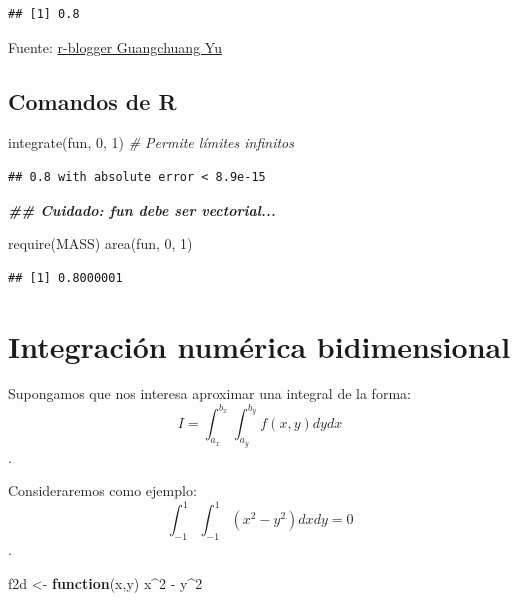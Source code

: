 \documentclass[
]{book}
\newenvironment{Shaded}{\begin{snugshade}}{\end{snugshade}}
\newcommand{\CommentTok}[1]{\textcolor[rgb]{0.56,0.35,0.01}{\textit{#1}}}
\newcommand{\ControlFlowTok}[1]{\textcolor[rgb]{0.13,0.29,0.53}{\textbf{#1}}}
\newcommand{\DecValTok}[1]{\textcolor[rgb]{0.00,0.00,0.81}{#1}}
\newcommand{\DocumentationTok}[1]{\textcolor[rgb]{0.56,0.35,0.01}{\textbf{\textit{#1}}}}
\newcommand{\FunctionTok}[1]{\textcolor[rgb]{0.00,0.00,0.00}{#1}}
\newcommand{\NormalTok}[1]{#1}
\newcommand{\OtherTok}[1]{\textcolor[rgb]{0.56,0.35,0.01}{#1}}
\newcommand{\SpecialCharTok}[1]{\textcolor[rgb]{0.00,0.00,0.00}{#1}}
\theoremstyle{break}
\theoremstyle{nonumberplain}
\begin{document}
\begin{verbatim}
## [1] 0.8
\end{verbatim}

Fuente: \href{https://www.r-bloggers.com/one-dimensional-integrals}{r-blogger Guangchuang Yu}

\hypertarget{comandos-de-r}{%
\subsection{Comandos de R}\label{comandos-de-r}}

\begin{Shaded}
\begin{Highlighting}[]
\FunctionTok{integrate}\NormalTok{(fun, }\DecValTok{0}\NormalTok{, }\DecValTok{1}\NormalTok{)   }\CommentTok{\# Permite límites infinitos  }
\end{Highlighting}
\end{Shaded}

\begin{verbatim}
## 0.8 with absolute error < 8.9e-15
\end{verbatim}

\begin{Shaded}
\begin{Highlighting}[]
\DocumentationTok{\#\# Cuidado: fun debe ser vectorial...}

\FunctionTok{require}\NormalTok{(MASS)}
\FunctionTok{area}\NormalTok{(fun, }\DecValTok{0}\NormalTok{, }\DecValTok{1}\NormalTok{)}
\end{Highlighting}
\end{Shaded}

\begin{verbatim}
## [1] 0.8000001
\end{verbatim}

\hypertarget{integraciuxf3n-numuxe9rica-bidimensional}{%
\section{Integración numérica bidimensional}\label{integraciuxf3n-numuxe9rica-bidimensional}}

Supongamos que nos interesa aproximar una integral de la forma:
\[I=\int_{a_x}^{b_x}\int_{a_y}^{b_y}f(x, y)dy dx\].

Consideraremos como ejemplo:
\[\int_{-1}^{1} \int_{-1}^{1} \left( x^2 - y^2 \right) dx dy = 0\].

\begin{Shaded}
\begin{Highlighting}[]
\NormalTok{f2d }\OtherTok{\textless{}{-}} \ControlFlowTok{function}\NormalTok{(x,y) x}\SpecialCharTok{\^{}}\DecValTok{2} \SpecialCharTok{{-}}\NormalTok{ y}\SpecialCharTok{\^{}}\DecValTok{2}
\end{Highlighting}
\end{Shaded}
\end{document}
